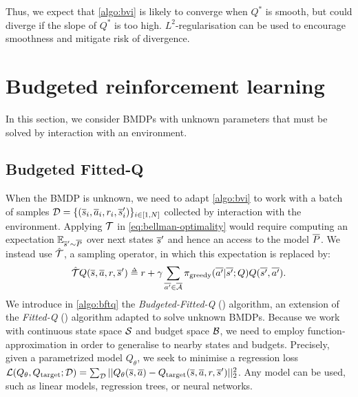 Thus, we expect that \autoref{algo:bvi} is likely to converge when $Q^*$ is smooth, but could diverge if the slope of $Q^*$ is too high.  $L^2$-regularisation can be used to encourage smoothness and mitigate risk of divergence.


\section{Budgeted reinforcement learning}

\label{sec:brl}

In this section, we consider BMDPs with unknown parameters that must be solved by interaction with an environment. 

\subsection{Budgeted Fitted-Q}
\label{subsec:bftq}

When the BMDP is unknown, we need to adapt \autoref{algo:bvi} to work with a batch of samples $\mathcal{D}=\{(\overline{s}_i,\overline{a}_i,r_i,\overline{s}_i')\}_{i\in [1,N]}$ collected by interaction with the environment. Applying $\mathcal{T}$ in \eqref{eq:bellman-optimality} would require computing an expectation $\operatorname*{\mathbb{E}}_{\overline{s}'\sim \overline{P}}$ over next states $\overline{s}'$ and hence an access to the model $\overline{P}$. We instead use $\hat{\mathcal{T}}$, a sampling operator, in which this expectation is replaced by:
\begin{equation*}
\hat{\cT} Q(\os, \oa, r, \os') \eqdef r + \gamma \sum_{\ov{a'}\in \ocA} \pi_\text{greedy}(\ov{a'}|\ov{s'}; Q) Q(\ov{s'}, \ov{a'}).
\end{equation*}
We introduce in \autoref{algo:bftq} the \emph{Budgeted-Fitted-Q} (\BFTQ) algorithm, an extension of the \emph{Fitted-Q} (\FTQ) algorithm \citep{Ernst2005,Riedmiller2005} adapted to solve unknown BMDPs. Because we work with continuous state space $\mathcal{S}$ and budget space $\mathcal{B}$, we need to employ function-approximation in order to generalise to nearby states and budgets. Precisely, given a parametrized model $Q_\theta$, we seek to minimise a regression loss $\mathcal{L}(Q_\theta, Q_\text{target};\mathcal{D}) = \sum_{\mathcal{D}} ||Q_\theta(\overline{s}, \overline{a}) - Q_\text{target}(\overline{s}, \overline{a}, r, \overline{s}')||_2^2$.
Any model can be used, such as linear models, regression trees, or neural networks.

